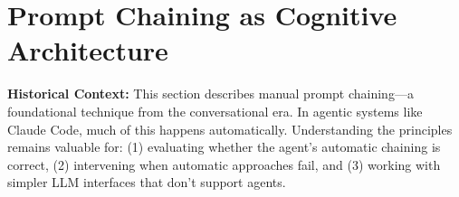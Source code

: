 \part{Prompt Chaining as Cognitive Architecture}

\begin{quotebox}
\textbf{Historical Context:} This section describes manual prompt chaining---a foundational technique from the conversational era. In agentic systems like Claude Code, much of this happens automatically. Understanding the principles remains valuable for: (1) evaluating whether the agent's automatic chaining is correct, (2) intervening when automatic approaches fail, and (3) working with simpler LLM interfaces that don't support agents.
\end{quotebox}
